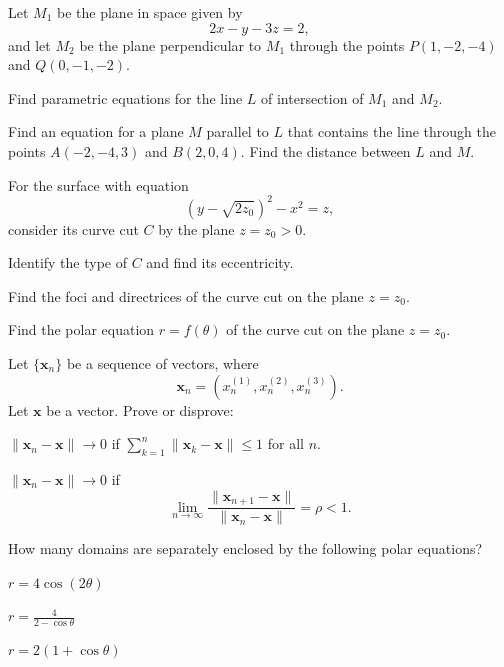 \begin{problem}
Let $M_1$ be the plane in space given by
\[
2x-y-3z=2,
\]
and let $M_2$ be the plane perpendicular to $M_1$ through the points $P(1, -2, -4)$ and $Q(0, -1, -2)$.
\begin{problemsubparts}
\item Find parametric equations for the line $L$ of intersection of $M_1$ and $M_2$.
\item Find an equation for a plane $M$ parallel to $L$ that contains the line through the points $A(-2, -4, 3)$ and $B(2, 0, 4)$. Find the distance between $L$ and $M$.
\end{problemsubparts}
\end{problem}

\begin{problem}
For the surface with equation
\[
(y-\sqrt{2z_0})^2-x^2=z,
\]
consider its curve cut $C$ by the plane $z=z_0>0$.
\begin{problemsubparts}
\item Identify the type of $C$ and find its eccentricity.
\item Find the foci and directrices of the curve cut on the plane $z=z_0$.
\item Find the polar equation $r=f(\theta)$ of the curve cut on the plane $z=z_0$.
\end{problemsubparts}
\end{problem}

\begin{problem}
Let $\{\mathbf{x}_n\}$ be a sequence of vectors, where
\[
\mathbf{x}_n=(x_n^{(1)}, x_n^{(2)}, x_n^{(3)}).
\]
Let $\mathbf{x}$ be a vector. Prove or disprove:
\begin{problemsubparts}
\item $\|\mathbf{x}_n-\mathbf{x}\|\to0$ if $\displaystyle\sum_{k=1}^{n}\|\mathbf{x}_k-\mathbf{x}\|\le1$ for all $n$.
\item $\|\mathbf{x}_n-\mathbf{x}\|\to0$ if
\[
\lim_{n\to\infty}\frac{\|\mathbf{x}_{n+1}-\mathbf{x}\|}{\|\mathbf{x}_n-\mathbf{x}\|}=\rho<1.
\]
\end{problemsubparts}
\end{problem}

\begin{problem}
How many domains are separately enclosed by the following polar equations?
\begin{problemchoices}
\item $r=4\cos(2\theta)$
\item $\displaystyle r=\frac{4}{2-\cos\theta}$
\item $r=2(1+\cos\theta)$
\end{problemchoices}
\end{problem}

